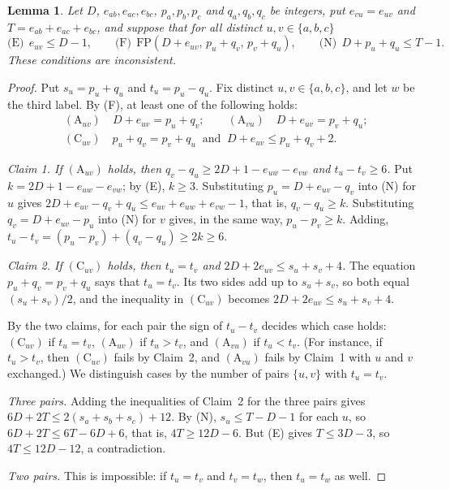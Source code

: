 \documentclass[11pt]{article}
\newtheorem{lemma}[theorem]{Lemma}
\theoremstyle{remark}
\newcommand{\FP}{\mathrm{FP}}
\begin{document}
\begin{lemma}\label{lem:core}
Let $D$, $e_{ab},e_{ac},e_{bc}$, $p_a,p_b,p_c$ and $q_a,q_b,q_c$ be integers,
put $e_{vu}=e_{uv}$ and $T=e_{ab}+e_{ac}+e_{bc}$, and suppose that for all distinct
$u,v\in\{a,b,c\}$
\[
 \text{(E)}\ \ e_{uv}\le D-1,\qquad
 \text{(F)}\ \ \FP(D+e_{uv},\,p_u+q_v,\,p_v+q_u),\qquad
 \text{(N)}\ \ D+p_u+q_u\le T-1.
\]
These conditions are inconsistent.
\end{lemma}
\begin{proof}
Put $s_u=p_u+q_u$ and $t_u=p_u-q_u$. Fix distinct $u,v\in\{a,b,c\}$, and let
$w$ be the third label. By (F), at least one of the following holds:
\begin{align*}
 &(\mathrm A_{uv})\quad D+e_{uv}=p_u+q_v;\qquad
 (\mathrm A_{vu})\quad D+e_{uv}=p_v+q_u;\\
 &(\mathrm C_{uv})\quad p_u+q_v=p_v+q_u\ \text{ and }\ D+e_{uv}\le p_u+q_v+2.
\end{align*}

\emph{Claim 1. If $(\mathrm A_{uv})$ holds, then
$q_v-q_u\ge2D+1-e_{uw}-e_{vw}$ and $t_u-t_v\ge6$.} Put
$k=2D+1-e_{uw}-e_{vw}$; by (E), $k\ge3$. Substituting $p_u=D+e_{uv}-q_v$ into
(N) for $u$ gives $2D+e_{uv}-q_v+q_u\le e_{uv}+e_{uw}+e_{vw}-1$, that is,
$q_v-q_u\ge k$. Substituting $q_v=D+e_{uv}-p_u$ into (N) for $v$ gives, in the
same way, $p_u-p_v\ge k$. Adding, $t_u-t_v=(p_u-p_v)+(q_v-q_u)\ge2k\ge6$.

\emph{Claim 2. If $(\mathrm C_{uv})$ holds, then $t_u=t_v$ and
$2D+2e_{uv}\le s_u+s_v+4$.} The equation $p_u+q_v=p_v+q_u$ says that
$t_u=t_v$. Its two sides add up to $s_u+s_v$, so both equal $(s_u+s_v)/2$, and
the inequality in $(\mathrm C_{uv})$ becomes $2D+2e_{uv}\le s_u+s_v+4$.

By the two claims, for each pair the sign of $t_u-t_v$ decides which case
holds: $(\mathrm C_{uv})$ if $t_u=t_v$, $(\mathrm A_{uv})$ if $t_u>t_v$, and
$(\mathrm A_{vu})$ if $t_u<t_v$. (For instance, if $t_u>t_v$, then
$(\mathrm C_{uv})$ fails by Claim~2, and $(\mathrm A_{vu})$ fails by Claim~1
with $u$ and $v$ exchanged.) We distinguish cases by the number of pairs
$\{u,v\}$ with $t_u=t_v$.

\emph{Three pairs.} Adding the inequalities of Claim~2 for the three pairs
gives $6D+2T\le2(s_a+s_b+s_c)+12$. By (N), $s_u\le T-D-1$ for each $u$, so
$6D+2T\le6T-6D+6$, that is, $4T\ge12D-6$. But (E) gives $T\le3D-3$, so
$4T\le12D-12$, a contradiction.

\emph{Two pairs.} This is impossible: if $t_u=t_v$ and $t_v=t_w$, then
$t_u=t_w$ as well.


\end{proof}
\end{document}
